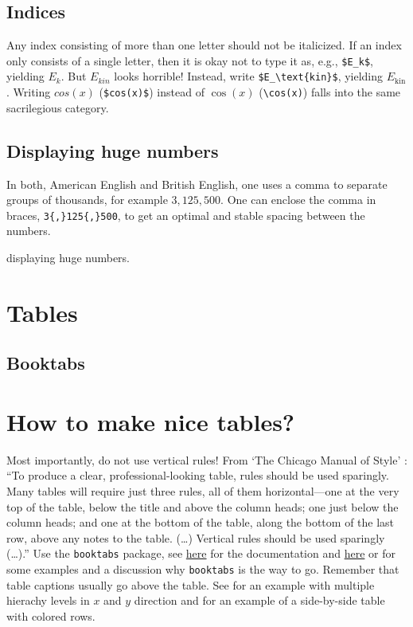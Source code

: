 \subsection{Indices}
Any index consisting of more than one letter should not be italicized.
If an index only consists of a single letter, then it is okay not to type it as, e.g., \verb|$E_k$|, yielding $E_k$. But $E_{kin}$ looks horrible! Instead, write \verb|$E_\text{kin}$|, yielding $E_\text{kin}$.
Writing $cos(x)$ (\verb|$cos(x)$|) instead of $\cos(x)$ (\verb|\cos(x)|) falls into the same sacrilegious category.

\subsection{Displaying huge numbers}
In both, American English and British English, one uses a comma to separate groups of thousands, for example $3{,}125{,}500$. One can enclose the comma in braces, \verb|3{,}125{,}500|, to get an optimal and stable spacing between the numbers. 


displaying huge numbers.
\section{Tables}
\subsection{Booktabs}


\section{How to make nice tables?}
Most importantly, do not use vertical rules!
From `The Chicago Manual of Style' \cite{chicagoMOS}: ``To produce a clear, professional-looking table, rules should be used sparingly. Many tables will require just three rules, all of them horizontal—one at the very top of the table, below the title and above the column heads; one just below the column heads; and one at the bottom of the table, along the bottom of the last row, above any notes to the table. (\ldots) Vertical rules should be used sparingly (\ldots).'' 
Use the \verb|booktabs| package, see  \href{https://ctan.org/pkg/booktabs}{here} for the documentation and \href{https://nhigham.com/2019/11/19/better-latex-tables-with-booktabs/}{here} or \href{}{} for some examples and a discussion why \verb|booktabs| is the way to go. Remember that table captions usually go above the table. See  for an example with multiple hierachy levels in $x$ and $y$ direction and  for an example of a side-by-side table with colored rows.

